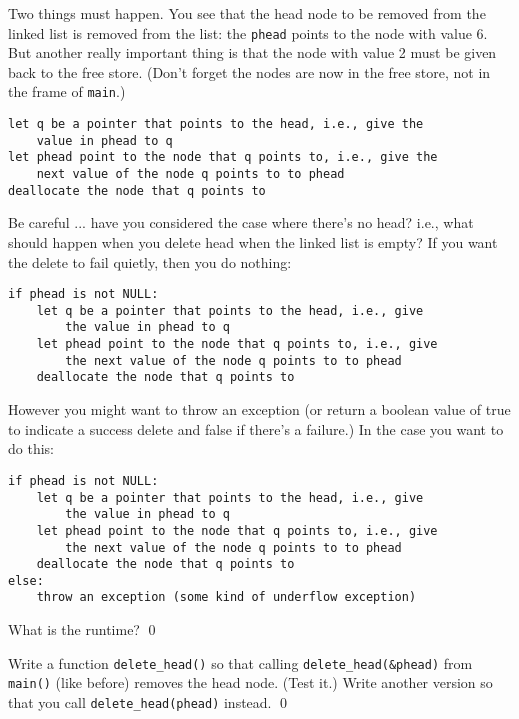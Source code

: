 Two things must happen.
You see that the head node to be removed from the linked list
is removed from the list: the \verb!phead! points to the node with
value 6.
But another really important thing is that the node with value 2
must be given back to the free store.
(Don't forget the nodes are now in the free store, not in the frame of
\verb!main!.)

\begin{Verbatim}[frame=single]
let q be a pointer that points to the head, i.e., give the
    value in phead to q
let phead point to the node that q points to, i.e., give the
    next value of the node q points to to phead
deallocate the node that q points to
\end{Verbatim}

Be careful ... have you considered the case where there's no head?
i.e., what should happen when you delete head when the linked list
is empty?
If you want the delete to fail quietly, then you do nothing:
\begin{Verbatim}[frame=single]
if phead is not NULL:
    let q be a pointer that points to the head, i.e., give
        the value in phead to q
    let phead point to the node that q points to, i.e., give
        the next value of the node q points to to phead
    deallocate the node that q points to
\end{Verbatim}
However you might want to throw an exception
(or return a boolean value of true to indicate a success delete
and false if there's a failure.)
In the case you want to do this:
\begin{Verbatim}[frame=single]
if phead is not NULL:
    let q be a pointer that points to the head, i.e., give
        the value in phead to q
    let phead point to the node that q points to, i.e., give
        the next value of the node q points to to phead
    deallocate the node that q points to
else:
    throw an exception (some kind of underflow exception)
\end{Verbatim}


\begin{ex}
 What is the runtime?
\qed
\end{ex}

\begin{ex}
Write a function \texttt{delete\_head()} so that
calling \texttt{delete\_head(\&phead)}
from \texttt{main()} (like before)
removes the head node.
(Test it.)
Write another version so that you call
\verb!delete_head(phead)! instead.
\qed
\end{ex}


